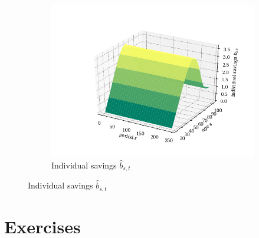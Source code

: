 \documentclass[letterpaper,12pt]{article}
\theoremstyle{definition}
\begin{document}
\begin{figure}[htbp]
\begin{subfigure}[b]{0.4\textwidth}
      \end{subfigure}
      \begin{subfigure}[b]{0.4\textwidth}
        \includegraphics[width=\textwidth]{images/TP_bs_path.png}
        \caption{Individual savings $\hat{b}_{s,t}$}
        \label{FigTP_csnsbs_b}
      \end{subfigure}
    \end{figure}

    \clearpage


\section{Exercises}\label{SecExercises}

  \renewcommand\theenumi{\alph{enumi}}
\end{document}
